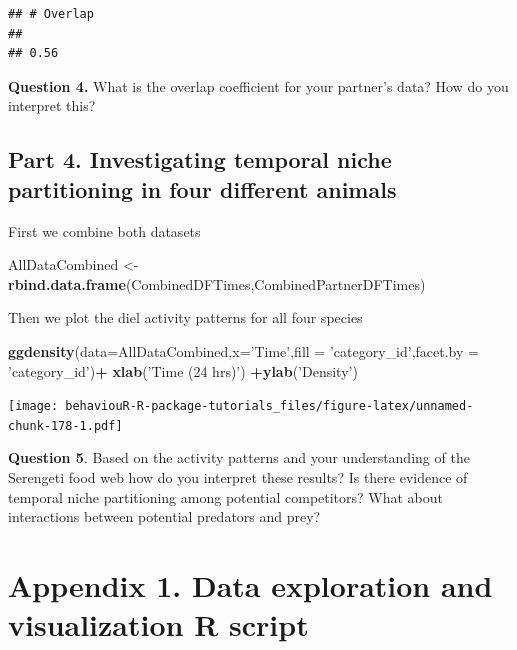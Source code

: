 \documentclass[]{book}
\newenvironment{Shaded}{\begin{snugshade}}{\end{snugshade}}
\newcommand{\DataTypeTok}[1]{\textcolor[rgb]{0.13,0.29,0.53}{#1}}
\newcommand{\KeywordTok}[1]{\textcolor[rgb]{0.13,0.29,0.53}{\textbf{#1}}}
\newcommand{\NormalTok}[1]{#1}
\newcommand{\OperatorTok}[1]{\textcolor[rgb]{0.81,0.36,0.00}{\textbf{#1}}}
\newcommand{\StringTok}[1]{\textcolor[rgb]{0.31,0.60,0.02}{#1}}
\begin{document}
\begin{verbatim}
## # Overlap
## 
## 0.56
\end{verbatim}

\textbf{Question 4.} What is the overlap coefficient for your partner's data? How do you interpret this?

\hypertarget{part-4.-investigating-temporal-niche-partitioning-in-four-different-animals}{%
\section{Part 4. Investigating temporal niche partitioning in four different animals}\label{part-4.-investigating-temporal-niche-partitioning-in-four-different-animals}}

First we combine both datasets

\begin{Shaded}
\begin{Highlighting}[]
\NormalTok{AllDataCombined <-}\StringTok{ }\KeywordTok{rbind.data.frame}\NormalTok{(CombinedDFTimes,CombinedPartnerDFTimes)}
\end{Highlighting}
\end{Shaded}

Then we plot the diel activity patterns for all four species

\begin{Shaded}
\begin{Highlighting}[]
\KeywordTok{ggdensity}\NormalTok{(}\DataTypeTok{data=}\NormalTok{AllDataCombined,}\DataTypeTok{x=}\StringTok{'Time'}\NormalTok{,}\DataTypeTok{fill =} \StringTok{'category_id'}\NormalTok{,}\DataTypeTok{facet.by =} \StringTok{'category_id'}\NormalTok{)}\OperatorTok{+}
\StringTok{  }\KeywordTok{xlab}\NormalTok{(}\StringTok{'Time (24 hrs)'}\NormalTok{) }\OperatorTok{+}\KeywordTok{ylab}\NormalTok{(}\StringTok{'Density'}\NormalTok{)}
\end{Highlighting}
\end{Shaded}

\texttt{[image: behaviouR-R-package-tutorials\_files/figure-latex/unnamed-chunk-178-1.pdf]}

\textbf{Question 5}. Based on the activity patterns and your understanding of the Serengeti food web how do you interpret these results? Is there evidence of temporal niche partitioning among potential competitors? What about interactions between potential predators and prey?

\hypertarget{appendix-1.-data-exploration-and-visualization-r-script}{%
\chapter*{Appendix 1. Data exploration and visualization R script}\label{appendix-1.-data-exploration-and-visualization-r-script}}
\end{document}
